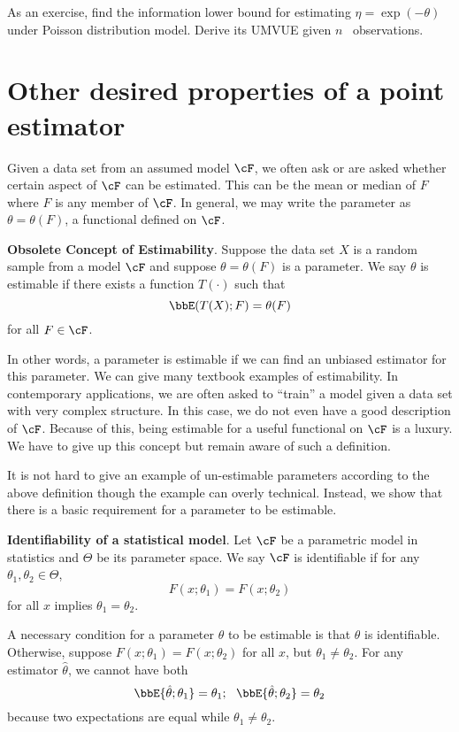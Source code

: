 As an exercise, find the information lower bound for estimating
$\eta = \exp( - \theta)$ under Poisson distribution model. Derive its
UMVUE given $n$ \iid\ observations.

\section{Other desired properties of a point estimator}

Given a data set from an assumed model $\cF$, we often ask
or are asked whether certain aspect of $\cF$ can be estimated. This
can be the mean or median of $F$ where $F$ is any member of $\cF$.
In general, we may write the parameter as $\theta = \theta(F)$, 
a functional defined on $\cF$.

\begin{defi}
{\bf Obsolete Concept of Estimability}. 
Suppose the data set $X$ is a random sample
from a model $\cF$ and suppose $\theta = \theta(F)$ is a
parameter. We say $\theta$ is estimable if there exists
a function $T(\cdot)$ such that
\[
\bbE(T(X); F) = \theta(F)
\]
for all $F \in \cF$.
\end{defi}


In other words, a parameter is estimable if we can find
an unbiased estimator for this parameter. We can give many
textbook examples of estimability. In contemporary applications,
we are often asked to ``train'' a model given a data set
with very complex structure. In this case, we do not even have a good
description of $\cF$. Because of this, being estimable for a
useful functional on $\cF$ is a luxury. 
We have to give up this concept but remain aware of such
a definition.

It is not hard to give an example of un-estimable
parameters according to the above definition though 
the example can overly technical. Instead, we show
that there is a basic requirement for a parameter to be estimable.

\begin{defi}
{\bf Identifiability of a statistical model}. 
Let $\cF$ be a parametric model in statistics and
$\Theta$ be its parameter space. We say
$\cF$ is identifiable if for any $\theta_1, \theta_2 \in \Theta$,
\[
F(x; \theta_1) = F(x; \theta_2)
\]
for all $x$ implies $\theta_1 = \theta_2$.
\end{defi}

A necessary condition for a parameter $\theta$ to be estimable
is that $\theta$ is identifiable. Otherwise,
suppose $F(x; \theta_1) = F(x; \theta_2)$ for all $x$, but
$\theta_1 \neq \theta_2$. 
For any estimator $\hat \theta$, we cannot have
both
\[
\bbE\{ \hat\theta; \theta_1\} = \theta_1;~~
\bbE\{ \hat\theta; \theta_2\} = \theta_2
\]
because two expectations are equal while $\theta_1 \neq \theta_2$.

